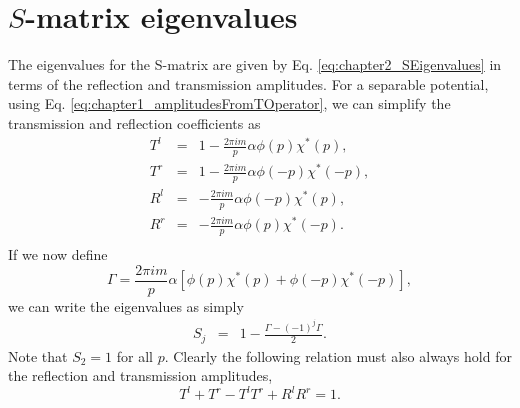 \section{$S$-matrix eigenvalues}
\label{Appendix:SeparablePotentials_AmplitudesAndEigenvaluesofS}
%
The eigenvalues for the S-matrix are given by Eq. \eqref{eq:chapter2_SEigenvalues} in terms of the reflection and transmission amplitudes. For a separable potential, using Eq. \eqref{eq:chapter1_amplitudesFromTOperator}, we can simplify the transmission and reflection coefficients as
\begin{eqnarray}
T^{l}&=&1-\frac{2 \pi i m}{p} \alpha \phi(p) \chi^{*}(p),
\nonumber \\
T^{r}&=&1-\frac{2 \pi i m}{p} \alpha \phi(-p) \chi^{*}(-p),
\nonumber \\
R^{l}&=&-\frac{2 \pi i m}{p} \alpha \phi(-p) \chi^{*}(p),
\nonumber \\
R^{r}&=&-\frac{2 \pi i m}{p} \alpha \phi(p) \chi^{*}(-p).
\nonumber \\
\end{eqnarray}
%
If we now define
%
\begin{equation}
\Gamma=\frac{2 \pi i m}{p} \alpha \left[\phi(p) \chi^{*}(p)+\phi(-p) \chi^{*}(-p)\right],
\end{equation}
%
we can write the eigenvalues as simply
%
\begin{eqnarray}
S_{j}&=&1-\frac{\Gamma-(-1)^{j}\Gamma}{2}.
\end{eqnarray}
%
Note that $S_2=1$ for all $p$. Clearly the following relation must also always hold for the reflection and transmission amplitudes,
%
\begin{equation}
T^l + T^r - T^l T^r + R^l R^r = 1.
\end{equation}
%
%
%
